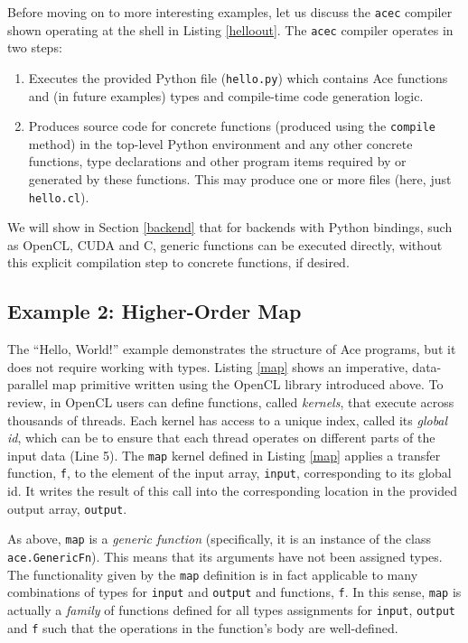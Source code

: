 \documentclass[9pt,preprint]{sigplanconf}
\begin{document}
Before moving on to more interesting examples, let us discuss the \verb|acec| compiler shown operating at the shell in Listing \ref{helloout}. The \verb|acec| compiler operates in two steps:
\begin{enumerate}
\item Executes the provided Python file (\verb|hello.py|) which contains Ace functions and (in future examples) types and compile-time code generation logic.
\item Produces source code for concrete functions (produced using the \verb|compile| method) in the top-level Python environment and any other concrete functions, type declarations and other program items required by or generated by these functions. This may produce one or more files (here, just \verb|hello.cl|).
\end{enumerate}

We will show in Section \ref{backend} that for backends with Python bindings, such as OpenCL, CUDA and C, generic functions can be executed directly, without this explicit compilation step to concrete functions, if desired.

\subsection{Example 2: Higher-Order Map}
The ``Hello, World!'' example demonstrates the structure of Ace programs, but it does not require working with types. Listing \ref{map} shows an imperative, data-parallel map primitive written using the OpenCL library introduced above. To review, in OpenCL users can define functions, called {\em kernels}, that execute across thousands of threads. Each kernel has access to a unique index, called its {\em global id}, which can be to ensure that each thread operates on different parts of the input data (Line 5). The \verb|map| kernel defined in Listing \ref{map} applies a transfer function, \verb|f|, to the element of the input array, \verb|input|, corresponding to its global id. It writes the result of this call into the corresponding location in the provided output array, \verb|output|.

As above, \verb|map| is a {\em generic function} (specifically, it is an instance of the class \verb|ace.GenericFn|). This means that its arguments have not been assigned types. The functionality given by the \verb|map| definition is in fact applicable to many combinations of types for \verb|input| and \verb|output| and functions, \verb|f|. In this sense, \verb|map| is actually a \emph{family} of functions defined for all types assignments for \verb|input|, \verb|output| and \verb|f| such that the operations in the function's body are well-defined.
\end{document}
